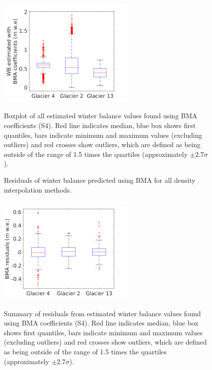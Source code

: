 \documentclass{sfuthesis}
\newcommand{\boxMatlab}{Red line indicates median, blue box shows first quantiles, bars indicate minimum and maximum values (excluding outliers) and red crosses show outliers, which are defined as being outside of the range of 1.5 times the quartiles (approximately $\pm2.7\sigma$). }
\begin{document}
{\begin{figure}[H]
\centering
	\includegraphics[width =0.6\textwidth]{ModelledSWE_box_BMS.png}\\
\caption[Boxplot of all estimated winter balance values found using BMA coefficients (S4)]{Boxplot of all estimated winter balance values found using BMA coefficients (S4). \boxMatlab}
\label{fig:BMAsweboxplot}
\end{figure} 

\begin{figure}[H]
	\caption{Residuals of winter balance predicted using BMA for all density interpolation methods.}
	\label{fig:BMSresiduals_all}
\end{figure}

\begin{figure}[H]
\centering
	\includegraphics[width =0.6\textwidth]{residuals_box_BMS.png}\\
\caption[Summary of residuals from estimated winter balance values found using BMA coefficients (S4)]{Summary of residuals from estimated winter balance values found using BMA coefficients (S4). \boxMatlab}
\label{fig:BMAresidualsboxplot}
\end{figure} 

}
\end{document}
